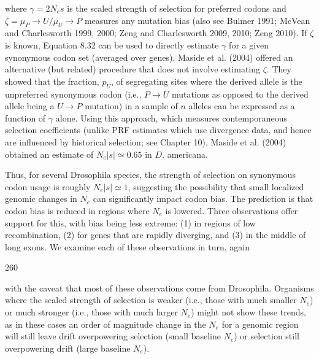 \documentclass{article}
\begin{document}
where  $ \gamma = 2N_e s $ is the scaled strength of selection for preferred codons and  $ \zeta = \mu_P \rightarrow U / \mu_U \rightarrow P $ measures any mutation bias (also see Bulmer 1991; McVean and Charlesworth 1999, 2000; Zeng and Charlesworth 2009, 2010; Zeng 2010). If  $ \zeta $ is known, Equation 8.32 can be used to directly estimate  $ \gamma $ for a given synonymous codon set (averaged over genes). Maside et al. (2004) offered an alternative (but related) procedure that does not involve estimating  $ \zeta $. They showed that the fraction,  $ p_U $, of segregating sites where the derived allele is the unpreferred synonymous codon (i.e.,  $ P \rightarrow U $ mutations as opposed to the derived allele being a  $ U \rightarrow P $ mutation) in a sample of  $ n $ alleles can be expressed as a function of  $ \gamma $ alone. Using this approach, which measures contemporaneous selection coefficients (unlike PRF estimates which use divergence data, and hence are influenced by historical selection; see Chapter 10), Maside et al. (2004) obtained an estimate of  $ N_e |s| \simeq 0.65 $ in  $ D $. americana.

Thus, for several Drosophila species, the strength of selection on synonymous codon usage is roughly  $ N_e | s| \simeq 1 $, suggesting the possibility that small localized genomic changes in  $ N_e $ can significantly impact codon bias. The prediction is that codon bias is reduced in regions where  $ N_e $ is lowered. Three observations offer support for this, with bias being less extreme: (1) in regions of low recombination, (2) for genes that are rapidly diverging, and (3) in the middle of long exons. We examine each of these observations in turn, again

260

with the caveat that most of these observations come from Drosophila. Organisms where the scaled strength of selection is weaker (i.e., those with much smaller  $ N_{e} $) or much stronger (i.e., those with much larger  $ N_{e} $) might not show these trends, as in these cases an order of magnitude change in the  $ N_{e} $ for a genomic region will still leave drift overpowering selection (small baseline  $ N_{e} $) or selection still overpowering drift (large baseline  $ N_{e} $).
\end{document}
